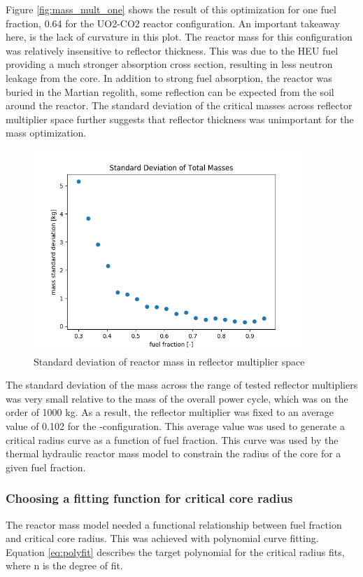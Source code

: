 Figure \ref{fig:mass_mult_one} shows the result of this optimization for one
fuel fraction, 0.64 for the UO2-CO2 reactor configuration. An important takeaway here, is the lack of curvature in
this plot. The reactor mass for this configuration was relatively insensitive to
reflector thickness. This was due to the HEU fuel providing a much
stronger absorption cross section, resulting in less neutron leakage from the core. In
addition to strong fuel absorption, the reactor was buried in the Martian
regolith, some reflection can be expected from the soil around the reactor.
The standard deviation of the critical masses across reflector multiplier space
further suggests that reflector thickness was unimportant for the mass
optimization.

\begin{figure}[h]
    \centering
    \includegraphics[width=4in]{../images/mass_std_uo2_co2.png}
\caption{Standard deviation of reactor mass in reflector multiplier space}
\label{fig:mass_std_co2_uo2}
\end{figure}

The standard deviation of the mass across the range of tested reflector
multipliers was very small relative to the mass of the overall power cycle,
which was on the order of 1000 kg. As a result, the reflector multiplier was fixed to an
average value of 0.102 for the \uox-\codiox configuration. 
This average value was used to generate a critical radius
curve as a function of fuel fraction. This curve was used by the thermal
hydraulic reactor mass model to constrain the radius of the core for a given
fuel fraction. 


\subsubsection{Choosing a fitting function for critical core radius}
The reactor mass model needed a functional relationship between fuel fraction
and critical core radius. This was achieved with polynomial curve fitting.
Equation \ref{eq:polyfit} describes the target polynomial for the critical
radius fits, where n is the degree of fit.

